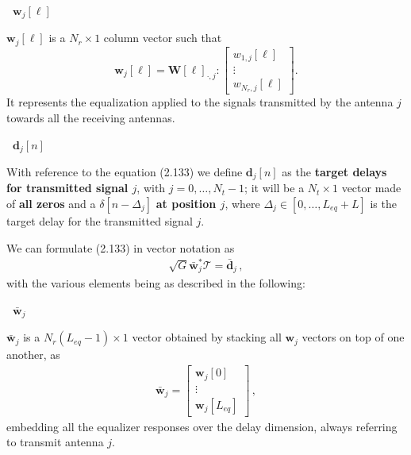 \documentclass[a4paper, 12pt]{book}
\begin{document}
\vspace{1em}
\noindent
\colorbox{obsidianBlue}{%
    \begin{minipage}{\dimexpr\linewidth-2\fboxsep}
    \textcolor{obsidianTextBlue}{\textbf{\faPen\ $\mathbf{w}_j[\ell]$}}
    
    $\mathbf{w}_j[\ell]$ is a $N_r \times 1$ column vector such that
    \[
    \mathbf{w}_j[\ell] = \mathbf{W}[\ell]_{\cdot, j} : 
    \begin{bmatrix}
     w_{1,j}[\ell] \\ \vdots \\ w_{N_r,j}[\ell]
    \end{bmatrix} .
    \]
    It represents the equalization applied to the signals transmitted by the antenna $j$ towards all the receiving antennas.
    \end{minipage}%
}
\vspace{1em}

\noindent
\colorbox{obsidianBlue}{%
    \begin{minipage}{\dimexpr\linewidth-2\fboxsep}
    \textcolor{obsidianTextBlue}{\textbf{\faPen\ $\mathbf{d}_j[n]$}}
    
    With reference to the equation (2.133) we define $\mathbf{d}_j[n]$ as the \textbf{target delays for transmitted signal $j$}, with $j=0, \dots, N_t-1$; it will be a $N_t \times 1$ vector made of \textbf{all zeros} and a $\delta[n-\Delta_j]$ \textbf{at position $j$}, where $\Delta_j \in [0, \dots, L_{eq}+L]$ is the target delay for the transmitted signal $j$.
    \end{minipage}%
}
\vspace{1em}

We can formulate (2.133) in vector notation as
\begin{align}
    \sqrt{G}\bar{\mathbf{w}}_j^* \mathcal{T} = \bar{\mathbf{d}}_j \,, \tag{2.137}
\end{align}
with the various elements being as described in the following:

\vspace{1em}
\noindent
\colorbox{obsidianBlue}{%
    \begin{minipage}{\dimexpr\linewidth-2\fboxsep}
    \textcolor{obsidianTextBlue}{\textbf{\faPen\ $\bar{\mathbf{w}}_j$}}
    
    $\bar{\mathbf{w}}_j$ is a $N_r(L_{eq}-1) \times 1$ vector obtained by stacking all $\mathbf{w}_j$ vectors on top of one another, as
    \begin{align}
        \bar{\mathbf{w}}_j = \begin{bmatrix} \mathbf{w}_j[0] \\ \vdots \\ \mathbf{w}_j[L_{eq}] \end{bmatrix} \,, \tag{2.134}
    \end{align}
    embedding all the equalizer responses over the delay dimension, always referring to transmit antenna $j$.
    \end{minipage}%
}
\vspace{1em}
\end{document}
